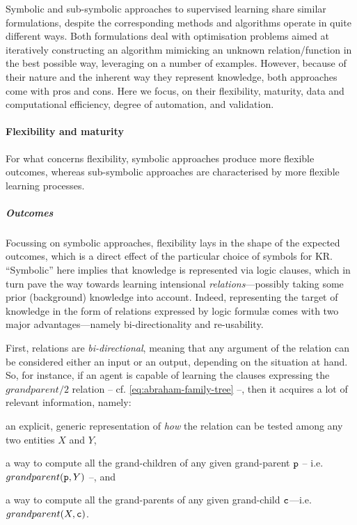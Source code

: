 \documentclass[12pt,a4paper,openright,twoside]{book}
\begin{document}
Symbolic and sub-symbolic approaches to supervised learning share similar formulations, despite the corresponding methods and algorithms operate in quite different ways.
%
Both formulations deal with optimisation problems aimed at iteratively constructing an algorithm mimicking an unknown relation/function in the best possible way, leveraging on a number of examples.
%
However, because of their nature and the inherent way they represent knowledge, both approaches come with pros and cons.
%
Here we focus, on their flexibility, maturity, data and computational efficiency, degree of automation, and validation.

\paragraph{Flexibility and maturity}

For what concerns flexibility, symbolic approaches produce more flexible outcomes, whereas sub-symbolic approaches are characterised by more flexible learning processes.

\subparagraph{Outcomes}

Focussing on symbolic approaches, flexibility lays in the shape of the expected outcomes, which is a direct effect of the particular choice of symbols for KR.
%
``Symbolic'' here implies that knowledge is represented via logic clauses, which in turn pave the way towards learning intensional \emph{relations}---possibly taking some prior (background) knowledge into account.
%
Indeed, representing the target of knowledge in the form of relations expressed by logic formul\ae{} comes with two major advantages---namely bi-directionality and re-usability.

First, relations are \emph{bi-directional}, meaning that any argument of the relation can be considered either an input or an output, depending on the situation at hand.
%
So, for instance, if an agent is capable of learning the clauses expressing the $grandparent/2$ relation -- cf. \cref{eq:abraham-family-tree} --, then it acquires a lot of relevant information, namely:
%
\begin{inlinelist}
    \item an explicit, generic representation of \emph{how} the relation can be tested among any two entities $X$ and $Y$,
    \item a way to compute all the grand-children of any given grand-parent $\mathtt{p}$ -- i.e. $grandparent(\mathtt{p}, Y)$ --, and
    \item a way to compute all the grand-parents of any given grand-child $\mathtt{c}$---i.e. $grandparent(X, \mathtt{c})$.
\end{inlinelist}
\end{document}

